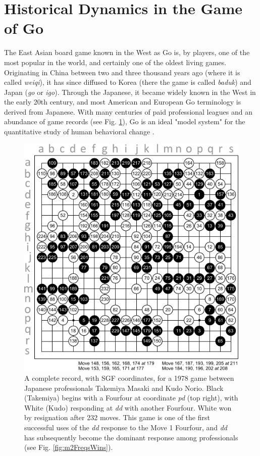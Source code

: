 \documentclass[reqno,12pt]{amsart}
\begin{document}
\section{Historical Dynamics in the Game of Go}

The East Asian board game known in the West as Go is, by players, one of the most popular in the world, and certainly one of the oldest living games. Originating in China between two and three thousand years ago (where it is called \textit{weiqi}), it has since diffused to Korea (there the game is called \textit{baduk}) and Japan (\textit{go} or \textit{igo}). Through the Japanese, it became widely known in the West in the early 20th century, and most American and European Go terminology is derived from Japanese. With many centuries of paid professional leagues and an abundance of game records (see Fig. \ref{fig:kifu}), Go is an ideal "model system" for the quantitative study of human behavioral change \citep{gobet2004moves}.

\begin{figure}[t]
  \begin{center}
    \includegraphics[scale=1.3]{./assets/kifu.pdf}
    \caption{A complete record, with SGF coordinates, for a 1978 game between Japanese professionals Takemiya Masaki and Kudo Norio. Black (Takemiya) begins with a Fourfour at coordinate \textit{pd} (top right), with White (Kudo) responding at \textit{dd} with another Fourfour. White won by resignation after 232 moves. This game is one of the first successful uses of the \textit{dd} response to the Move 1 Fourfour, and \textit{dd} has subsequently become the dominant response among professionals (see Fig. \ref{fig:m2FreqsWins}).}
    \label{fig:kifu}
  \end{center}
\end{figure}
\end{document}
